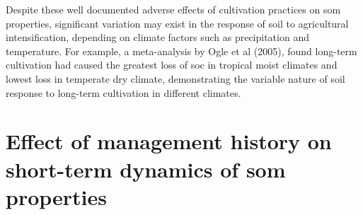 		Despite these well documented adverse effects of cultivation practices on \gls{som} properties, significant variation may exist in the response of soil to agricultural intensification, depending on climate factors such as precipitation and temperature. For example, a meta-analysis by Ogle et al (2005), found long-term cultivation had caused the greatest loss of \gls{soc} in tropical moist climates and lowest loss in temperate dry climate, demonstrating the variable nature of soil response to long-term cultivation in different climates.\\

\section{Effect of management history on short-term dynamics of \gls{som} properties}

